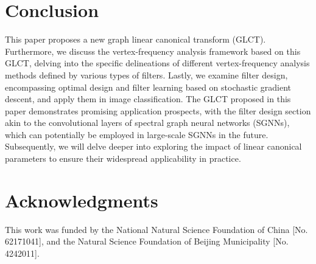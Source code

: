 \documentclass[lettersize,journal]{IEEEtran}
\begin{document}
\section{Conclusion} \label{sec6}
This paper proposes a new graph linear canonical transform (GLCT). Furthermore, we discuss the vertex-frequency analysis framework based on this GLCT, delving into the specific delineations of different vertex-frequency analysis methods defined by various types of filters. Lastly, we examine filter design, encompassing optimal design and filter learning based on stochastic gradient descent, and apply them in image classification. The GLCT proposed in this paper demonstrates promising application prospects, with the filter design section akin to the convolutional layers of spectral graph neural networks (SGNNs), which can potentially be employed in large-scale SGNNs in the future. Subsequently, we will delve deeper into exploring the impact of linear canonical parameters to ensure their widespread applicability in practice.



\section*{Acknowledgments}
This work was funded by the National Natural Science Foundation of China [No. 62171041], and the Natural Science Foundation of Beijing Municipality [No. 4242011].














\vfill
\end{document}
